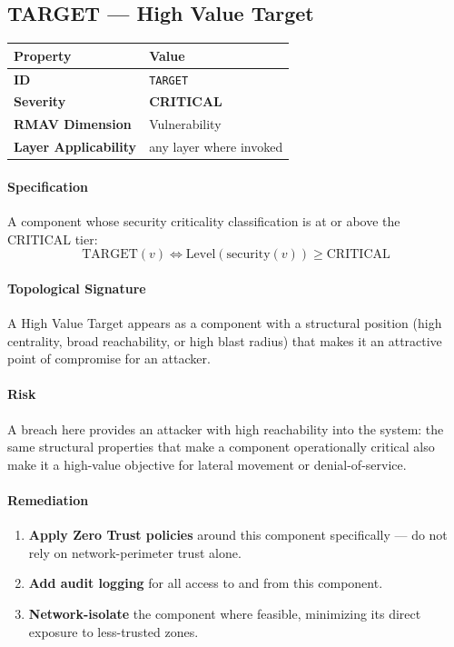\documentclass[11pt]{article}
\makeatletter
\newcommand{\CRITICAL}{\textcolor{red!70!black}{\textbf{CRITICAL}}}
\newcommand{\patternprop}[4]{%
  \begin{center}
  \begin{tabular}{@{}ll@{}}
  \toprule
  \textbf{Property} & \textbf{Value} \\
  \midrule
  \textbf{ID} & \texttt{#1} \\
  \textbf{Severity} & #2 \\
  \textbf{RMAV Dimension} & #3 \\
  \textbf{Layer Applicability} & #4 \\
  \bottomrule
  \end{tabular}
  \end{center}
}
\makeatother
\begin{document}
\subsection{TARGET --- High Value Target}
\patternprop{TARGET}{\CRITICAL}{Vulnerability}{any layer where invoked}

\paragraph{Specification}
A component whose security criticality classification is at or above the CRITICAL tier:
\[
\mathrm{TARGET}(v) \Leftrightarrow \mathrm{Level}(\mathrm{security}(v)) \ge \mathrm{CRITICAL}
\]

\paragraph{Topological Signature}
A High Value Target appears as a component with a structural position (high centrality, broad reachability, or high blast radius) that makes it an attractive point of compromise for an attacker.

\paragraph{Risk}
A breach here provides an attacker with high reachability into the system: the same structural properties that make a component operationally critical also make it a high-value objective for lateral movement or denial-of-service.

\paragraph{Remediation}
\begin{enumerate}[leftmargin=*]
\item \textbf{Apply Zero Trust policies} around this component specifically --- do not rely on network-perimeter trust alone.
\item \textbf{Add audit logging} for all access to and from this component.
\item \textbf{Network-isolate} the component where feasible, minimizing its direct exposure to less-trusted zones.
\end{enumerate}

\end{document}
